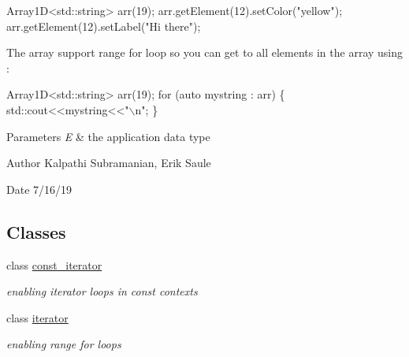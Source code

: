 \begin{DoxyCode}
Array1D<std::string> arr(19);
arr.getElement(12).setColor(\textcolor{stringliteral}{"yellow"});
arr.getElement(12).setLabel(\textcolor{stringliteral}{"Hi there"});
\end{DoxyCode}


The array support range for loop so you can get to all elements in the array using \+:


\begin{DoxyCode}
Array1D<std::string> arr(19);
\textcolor{keywordflow}{for} (\textcolor{keyword}{auto} mystring : arr) \{
  std::cout<<mystring<<\textcolor{stringliteral}{"\(\backslash\)n"};
\}
\end{DoxyCode}



\begin{DoxyParams}{Parameters}
{\em E} & the application data type \\
\hline
\end{DoxyParams}
\begin{DoxyAuthor}{Author}
Kalpathi Subramanian, Erik Saule 
\end{DoxyAuthor}
\begin{DoxyDate}{Date}
7/16/19 
\end{DoxyDate}
\subsection*{Classes}
\begin{DoxyCompactItemize}
\item 
class \hyperlink{classbridges_1_1datastructure_1_1_array1_d_1_1const__iterator}{const\+\_\+iterator}
\begin{DoxyCompactList}\small\item\em enabling iterator loops in const contexts \end{DoxyCompactList}\item 
class \hyperlink{classbridges_1_1datastructure_1_1_array1_d_1_1iterator}{iterator}
\begin{DoxyCompactList}\small\item\em enabling range for loops \end{DoxyCompactList}\end{DoxyCompactItemize}
